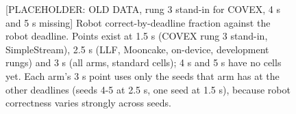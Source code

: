 \documentclass[sigconf]{acmart}
\begin{document}
{\selectfont
\begin{figure}[t]
  \centering
  
  \caption{[PLACEHOLDER: OLD DATA, rung 3 stand-in for COVEX, 4 s and 5 s missing] Robot correct-by-deadline fraction against the robot deadline. Points exist at 1.5 s (COVEX rung 3 stand-in, SimpleStream), 2.5 s (LLF, Mooncake, on-device, development rungs) and 3 s (all arms, standard cells); 4 s and 5 s have no cells yet. Each arm's 3 s point uses only the seeds that arm has at the other deadlines (seeds 4-5 at 2.5 s, one seed at 1.5 s), because robot correctness varies strongly across seeds.}
  \label{fig:F10_robot_deadline}
\end{figure}
}


\end{document}
